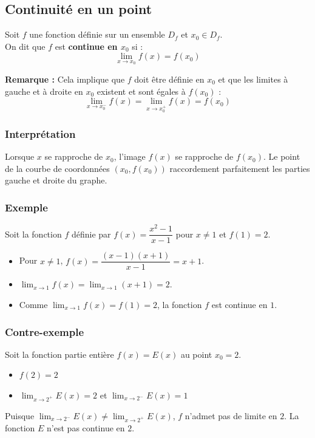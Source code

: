 \documentclass[12pt,a4paper]{article}
\newcounter{exemple} %
\begin{document}
\vspace{0.5cm}
\subsection{Continuité en un point}

\begin{tcolorbox}[
    colframe=primary,
    colback=boxbg,
    coltitle=white,
    colbacktitle=titlebg,
    fonttitle=\bfseries,
    title=Définition,
    arc=3mm,
    boxrule=1pt
]
Soit $f$ une fonction définie sur un ensemble $D_f$ et $x_0 \in D_f$.\\
On dit que $f$ est \textbf{continue en $x_0$} si :
\[
\lim_{x \to x_0} f(x) = f(x_0)
\]
\end{tcolorbox}

\noindent\textbf{Remarque :} Cela implique que $f$ doit être définie en $x_0$ et que les limites à gauche et à droite en $x_0$ existent et sont égales à $f(x_0)$ :
\[
\lim_{x \to x_0^-} f(x) = \lim_{x \to x_0^+} f(x) = f(x_0)
\]

\subsubsection*{Interprétation}
Lorsque $x$ se rapproche de $x_0$, l'image $f(x)$ se rapproche de $f(x_0)$. Le point de la courbe de coordonnées $(x_0, f(x_0))$ raccordement parfaitement les parties gauche et droite du graphe.

\subsubsection*{Exemple}
Soit la fonction $f$ définie par $f(x) = \dfrac{x^2 - 1}{x - 1}$ pour $x \neq 1$ et $f(1) = 2$.
\begin{itemize}
    \item Pour $x \neq 1$, $f(x) = \dfrac{(x-1)(x+1)}{x-1} = x + 1$.
    \item $\displaystyle\lim_{x \to 1} f(x) = \lim_{x \to 1} (x+1) = 2$.
    \item Comme $\displaystyle\lim_{x \to 1} f(x) = f(1) = 2$, la fonction $f$ est continue en $1$.
\end{itemize}

\subsubsection*{Contre-exemple}
Soit la fonction partie entière $f(x) = E(x)$ au point $x_0 = 2$.
\begin{itemize}
    \item $f(2) = 2$
    \item $\displaystyle\lim_{x \to 2^+} E(x) = 2$ \quad et \quad $\displaystyle\lim_{x \to 2^-} E(x) = 1$
\end{itemize}
Puisque $\displaystyle\lim_{x \to 2^-} E(x) \neq \lim_{x \to 2^+} E(x)$, $f$ n'admet pas de limite en $2$. La fonction $E$ n'est pas continue en $2$.
\end{document}
